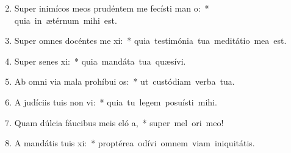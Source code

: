 \begin{flushleft}
\begin{enumerate}[leftmargin=*]
\setcounter{enumi}{1}

\item Super inimícos meos prudéntem me fecísti man o:~* \mbox{quia in ætérnum mihi est.}
\item Super omnes docéntes me xi:~* \mbox{quia testimónia tua meditátio mea est.}
\item Super senes xi:~* \mbox{quia mandáta tua quæsívi.}
\item Ab omni via mala prohíbui  os:~* \mbox{ut custódiam verba tua.}
\item A judíciis tuis non vi:~* \mbox{quia tu legem posuísti mihi.}
\item Quam dúlcia fáucibus meis eló a,~* \mbox{super mel ori meo!}
\item A mandátis tuis xi:~* \mbox{proptérea odívi omnem viam iniquitátis.}


\end{enumerate}
\end{flushleft}

